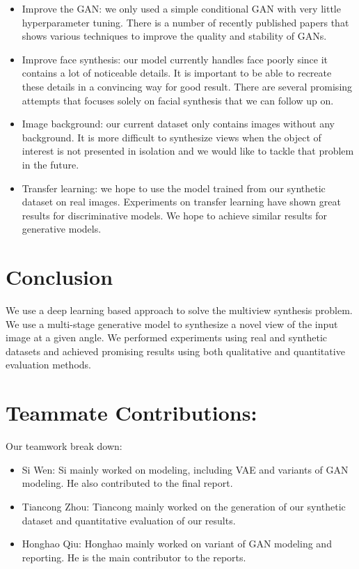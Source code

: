 \documentclass[10pt,conference]{IEEEtran}
\begin{document}
\begin{itemize}
\item Improve the GAN: we only used a simple conditional GAN with very little hyperparameter tuning. There is a number of recently published papers that shows various techniques to improve the quality and stability of GANs.

\item Improve face synthesis: our model currently handles face poorly since it contains a lot of noticeable details. It is important to be able to recreate these details in a convincing way for good result. There are several promising attempts \autocite{yim2015rotating, huang2017beyond} that focuses solely on facial synthesis that we can follow up on.

\item Image background: our current dataset only contains images without any background. It is more difficult to synthesize views when the object of interest is not presented in isolation and we would like to tackle that problem in the future.

\item Transfer learning: we hope to use the model trained from our synthetic dataset on real images. Experiments on transfer learning \autocite{shrivastava2016learning} have shown great results for discriminative models. We hope to achieve similar results for generative models.
\end{itemize}

\section{Conclusion}

We use a deep learning based approach to solve the multiview synthesis problem. We use a multi-stage generative model to synthesize a novel view of the input image at a given angle. We performed experiments using real and synthetic datasets and achieved promising results using both qualitative and quantitative evaluation methods.

\section{Teammate Contributions:}

Our teamwork break down:
\begin{itemize}
\item Si Wen: Si mainly worked on modeling, including VAE and variants of GAN modeling. He also contributed to the final report.
\item Tiancong Zhou: Tiancong mainly worked on the generation of our synthetic dataset and quantitative evaluation of our results.
\item Honghao Qiu: Honghao mainly worked on variant of GAN modeling and reporting. He is the main contributor to the reports.
\end{itemize}

\printbibliography
\end{document}
